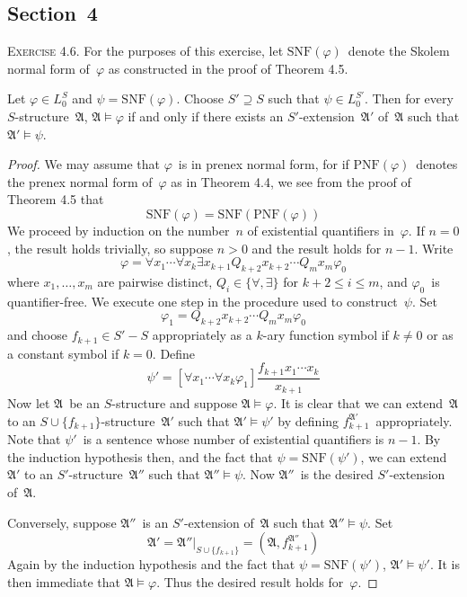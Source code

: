 \documentclass[letterpaper]{article}
\newcommand{\union}{\cup}
\newcommand{\A}{\mathfrak{A}}
\newcommand{\PNF}{\mathrm{PNF}}
\newcommand{\SNF}{\mathrm{SNF}}
\theoremstyle{remark}
\begin{document}
\subsection*{Section~4}
\noindent\textsc{Exercise 4.6.}
For the purposes of this exercise, let $\SNF(\varphi)$~denote the Skolem normal form of~$\varphi$ as constructed in the proof of Theorem 4.5.

Let $\varphi\in L_0^S$ and $\psi=\SNF(\varphi)$. Choose $S'\supseteq S$ such that $\psi\in L_0^{S'}$. Then for every $S$-structure~$\A$, $\A\models\varphi$ if and only if there exists an $S'$-extension~$\A'$ of~$\A$ such that $\A'\models\psi$.
\begin{proof}
We may assume that $\varphi$~is in prenex normal form, for if $\PNF(\varphi)$~denotes the prenex normal form of~$\varphi$ as in Theorem 4.4, we see from the proof of Theorem 4.5 that
$$\SNF(\varphi)=\SNF(\PNF(\varphi))$$
We proceed by induction on the number~$n$ of existential quantifiers in~$\varphi$. If $n=0$, the result holds trivially, so suppose $n>0$ and the result holds for $n-1$. Write
$$\varphi=\forall x_1\cdots\forall x_k\exists x_{k+1}Q_{k+2}x_{k+2}\cdots Q_mx_m\varphi_0$$
where $x_1,\ldots,x_m$ are pairwise distinct, $Q_i\in\{\forall,\exists\}$ for $k+2\le i\le m$, and $\varphi_0$~is quantifier-free. We execute one step in the procedure used to construct~$\psi$. Set
$$\varphi_1=Q_{k+2}x_{k+2}\cdots Q_mx_m\varphi_0$$
and choose $f_{k+1}\in S'-S$ appropriately as a $k$-ary function symbol if $k\ne0$ or as a constant symbol if $k=0$. Define
$$\psi'=[\forall x_1\cdots\forall x_k\varphi_1]\frac{f_{k+1}x_1\cdots x_k}{x_{k+1}}$$
Now let $\A$~be an $S$-structure and suppose $\A\models\varphi$. It is clear that we can extend~$\A$ to an $S\union\{f_{k+1}\}$-structure~$\A'$ such that $\A'\models\psi'$ by defining $f_{k+1}^{\A'}$~appropriately. Note that $\psi'$~is a sentence whose number of existential quantifiers is $n-1$. By the induction hypothesis then, and the fact that $\psi=\SNF(\psi')$, we can extend~$\A'$ to an $S'$-structure~$\A''$ such that $\A''\models\psi$. Now $\A''$~is the desired $S'$-extension of~$\A$.

Conversely, suppose $\A''$~is an $S'$-extension of~$\A$ such that $\A''\models\psi$. Set $$\A'=\A''|_{S\union\{f_{k+1}\}}=(\A,f_{k+1}^{\A''})$$
Again by the induction hypothesis and the fact that $\psi=\SNF(\psi')$, $\A'\models\psi'$. It is then immediate that $\A\models\varphi$. Thus the desired result holds for~$\varphi$.
\end{proof}
\end{document}
